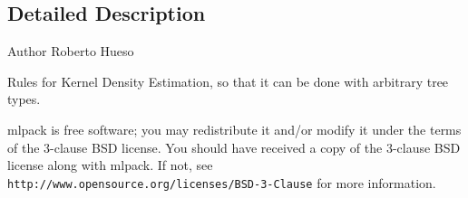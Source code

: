\subsection{Detailed Description}
\begin{DoxyAuthor}{Author}
Roberto Hueso
\end{DoxyAuthor}
Rules for Kernel Density Estimation, so that it can be done with arbitrary tree types.

mlpack is free software; you may redistribute it and/or modify it under the terms of the 3-\/clause B\+SD license. You should have received a copy of the 3-\/clause B\+SD license along with mlpack. If not, see {\tt http\+://www.\+opensource.\+org/licenses/\+B\+S\+D-\/3-\/\+Clause} for more information. 